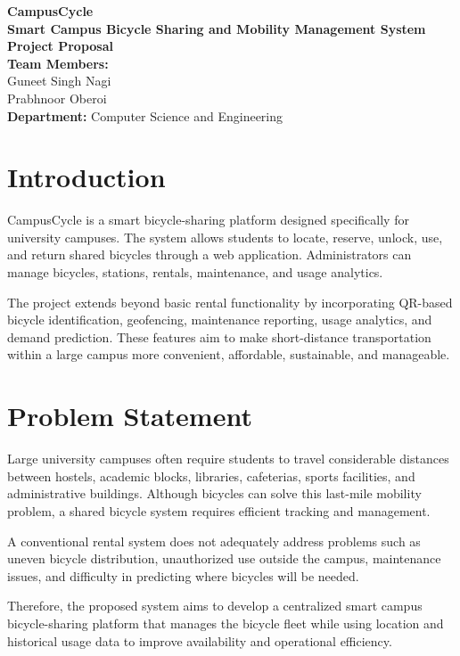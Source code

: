\documentclass[12pt,a4paper]{article}
\begin{document}
\begin{center}
    {\LARGE \textbf{CampusCycle}}\\[0.3cm]
    {\Large \textbf{Smart Campus Bicycle Sharing and Mobility Management System}}\\[0.6cm]
    \textbf{Project Proposal}\\[0.7cm]
    \textbf{Team Members:}\\[0.2cm]
    Guneet Singh Nagi\\
    Prabhnoor Oberoi\\[0.5cm]
    \textbf{Department:} Computer Science and Engineering
\end{center}

\section{Introduction}

CampusCycle is a smart bicycle-sharing platform designed specifically for university campuses. The system allows students to locate, reserve, unlock, use, and return shared bicycles through a web application. Administrators can manage bicycles, stations, rentals, maintenance, and usage analytics.

The project extends beyond basic rental functionality by incorporating QR-based bicycle identification, geofencing, maintenance reporting, usage analytics, and demand prediction. These features aim to make short-distance transportation within a large campus more convenient, affordable, sustainable, and manageable.

\section{Problem Statement}

Large university campuses often require students to travel considerable distances between hostels, academic blocks, libraries, cafeterias, sports facilities, and administrative buildings. Although bicycles can solve this last-mile mobility problem, a shared bicycle system requires efficient tracking and management.

A conventional rental system does not adequately address problems such as uneven bicycle distribution, unauthorized use outside the campus, maintenance issues, and difficulty in predicting where bicycles will be needed.

Therefore, the proposed system aims to develop a centralized smart campus bicycle-sharing platform that manages the bicycle fleet while using location and historical usage data to improve availability and operational efficiency.
\end{document}
